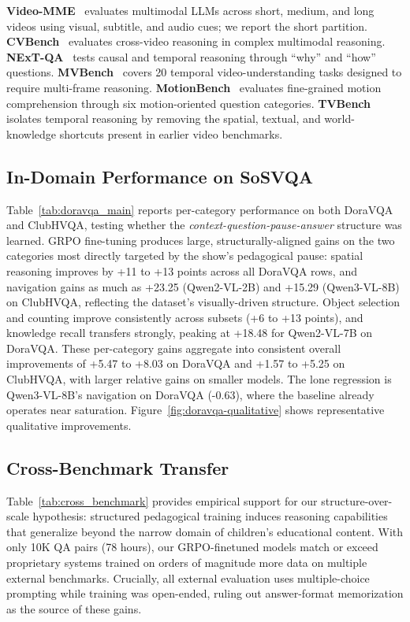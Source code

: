 \documentclass{article}
\begin{document}
\doravqamainresults
\noindent\textbf{Video-MME}~\cite{fu2025video} evaluates multimodal LLMs across
short, medium, and long videos using visual, subtitle, and audio cues; we
report the short partition. \textbf{CVBench}~\cite{zhu2025cvbench} evaluates
cross-video reasoning in complex multimodal reasoning. \textbf{NExT-QA}~\cite{xiao2021next}
tests causal and temporal reasoning through ``why'' and ``how'' questions.
\textbf{MVBench}~\cite{li2024mvbench} covers 20 temporal video-understanding
tasks designed to require multi-frame reasoning. \textbf{MotionBench}~\cite{hong2025motionbench}
evaluates fine-grained motion comprehension through six motion-oriented
question categories. \textbf{TVBench}~\cite{cores2024tvbench} isolates
temporal reasoning by removing the spatial, textual, and world-knowledge
shortcuts present in earlier video benchmarks.

\subsection{In-Domain Performance on SoSVQA}

Table~\ref{tab:doravqa_main} reports per-category performance on both
DoraVQA and ClubHVQA, testing whether the
\textit{context-question-pause-answer} structure was learned.
GRPO fine-tuning produces large, structurally-aligned gains on the two
categories most directly targeted by the show's pedagogical pause: spatial
reasoning improves by +11 to +13 points across all DoraVQA rows, and
navigation gains as much as +23.25 (Qwen2-VL-2B) and +15.29 (Qwen3-VL-8B)
on ClubHVQA, reflecting the dataset's visually-driven structure. Object
selection and counting improve consistently across subsets (+6 to +13
points), and knowledge recall transfers strongly, peaking at +18.48 for
Qwen2-VL-7B on DoraVQA. These per-category gains aggregate into consistent overall improvements of +5.47 to +8.03 on DoraVQA and +1.57 to +5.25 on ClubHVQA, with larger relative gains on smaller models. The lone regression is Qwen3-VL-8B's navigation on DoraVQA (-0.63), where the baseline already operates near saturation. Figure~\ref{fig:doravqa-qualitative} shows representative qualitative improvements.


\subsection{Cross-Benchmark Transfer}
\crossbenchmarkresults
Table~\ref{tab:cross_benchmark} provides empirical support for our structure-over-scale hypothesis: structured pedagogical training induces reasoning capabilities that generalize beyond the narrow domain of children's educational content. With only 10K QA pairs (78 hours), our GRPO-finetuned models match or exceed proprietary systems trained on orders of magnitude more data on multiple external benchmarks. Crucially, all external evaluation uses multiple-choice prompting while training was open-ended, ruling out answer-format memorization as the source of these gains.
\end{document}
